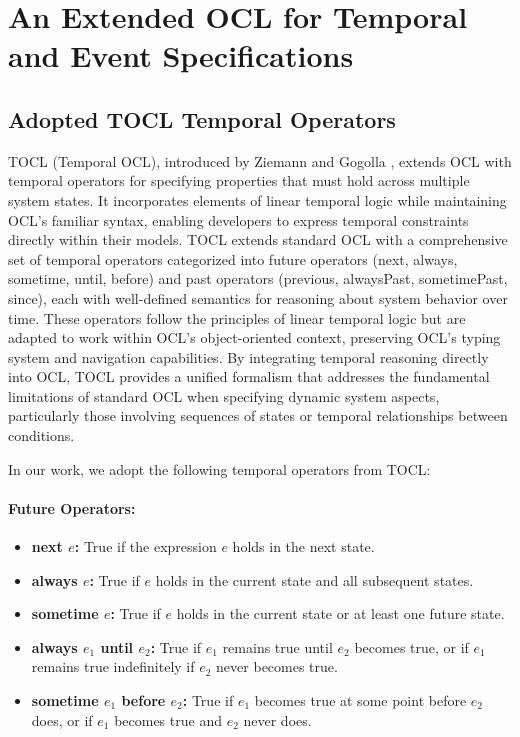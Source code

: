 \section{An Extended OCL for Temporal and Event Specifications}

\subsection{Adopted TOCL Temporal Operators}

\hspace{1cm} TOCL (Temporal OCL), introduced by Ziemann and Gogolla \cite{TOCL}, 
extends OCL with temporal operators for specifying properties that must hold across 
multiple system states. It incorporates elements of linear temporal logic while 
maintaining OCL's familiar syntax, enabling developers to express temporal constraints 
directly within their models. TOCL extends standard OCL with a comprehensive set of 
temporal operators categorized into future operators (next, always, sometime, until, 
before) and past operators (previous, alwaysPast, sometimePast, since), each with 
well-defined semantics for reasoning about system behavior over time. These operators 
follow the principles of linear temporal logic but are adapted to work within OCL's 
object-oriented context, preserving OCL's typing system and navigation capabilities. 
By integrating temporal reasoning directly into OCL, TOCL provides a unified formalism 
that addresses the fundamental limitations of standard OCL when specifying dynamic 
system aspects, particularly those involving sequences of states or temporal 
relationships between conditions.

In our work, we adopt the following temporal operators from TOCL:

\paragraph{Future Operators:} 
\begin{itemize} 
    \item \textbf{next $e$:} True if the expression $e$ holds in the next state. 
    \item \textbf{always $e$:} True if $e$ holds in the current state and all subsequent states. 
    \item \textbf{sometime $e$:} True if $e$ holds in the current state or at least one future state. 
    \item \textbf{always $e_1$ until $e_2$:} True if $e_1$ remains true until $e_2$ becomes true, or if $e_1$ remains true indefinitely if $e_2$ never becomes true. 
    \item \textbf{sometime $e_1$ before $e_2$:} True if $e_1$ becomes true at some point before $e_2$ does, or if $e_1$ becomes true and $e_2$ never does. 
\end{itemize}

